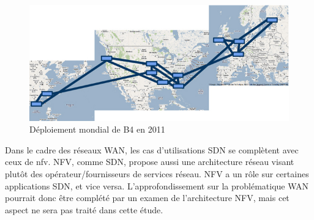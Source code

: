 \begin{figure}[!h] %
\centering
\includegraphics[width=13cm]{images/GoogleOpenFlowWAN.jpg} %
\caption{ Déploiement mondial de B4 en 2011 \cite{SDNWANB4}} %
\label{GoogleOpenFlowWAN} %
\end{figure} %



Dans le cadre des réseaux WAN, les cas d'utilisations SDN se complètent avec ceux de \gls{nfv}. NFV, comme SDN, propose aussi une architecture réseau visant plutôt des opérateur/fournisseurs de services réseau. NFV a un rôle sur certaines applications SDN, et vice versa. \cite{SDNNFVWAN} L'approfondissement sur la problématique WAN pourrait donc être complété par un examen de l'architecture NFV, mais cet aspect ne sera pas traité dans cette étude.







